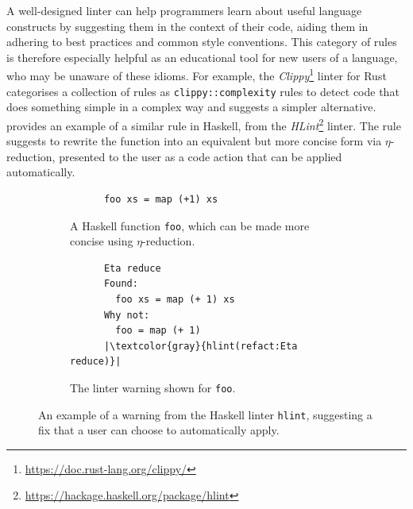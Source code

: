 A well-designed linter can help programmers learn about useful language constructs by suggesting them in the context of their code, aiding them in adhering to best practices and common style conventions.
This category of rules is therefore especially helpful as an educational tool for new users of a language, who may be unaware of these idioms.
For example, the \emph{Clippy}\footnote{\url{https://doc.rust-lang.org/clippy/}} linter for Rust \cite{li_clippy_2023} categorises a collection of rules as \texttt{clippy::complexity} rules to detect code that does something simple in a complex way and suggests a simpler alternative.
 provides an example of a similar rule in Haskell, from the \textit{HLint}\footnote{\url{https://hackage.haskell.org/package/hlint}} linter.
The rule suggests to rewrite the function into an equivalent but more concise form via $\eta$-reduction, presented to the user as a code action that can be applied automatically.

\begin{figure}[htbp]
  \vspace{3ex}
  \centering
  \begin{subfigure}{0.45\textwidth}
    \centering
    \begin{verbatim}
      foo xs = map (+1) xs
    \end{verbatim}
    \caption{A Haskell function \texttt{foo}, which can be made more concise using $\eta$-reduction.}
  \end{subfigure}
  \hfill
  \begin{subfigure}{0.45\textwidth}
    \centering
    \begin{verbatim}
      Eta reduce
      Found:
        foo xs = map (+ 1) xs
      Why not:
        foo = map (+ 1)
      |\textcolor{gray}{hlint(refact:Eta reduce)}|
    \end{verbatim}
    \caption{The linter warning shown for \texttt{foo}.}
  \end{subfigure}
  \caption{An example of a warning from the Haskell linter \texttt{hlint}, suggesting a fix that a user can choose to automatically apply.}
  \label{fig:hlint-example}
\end{figure}

